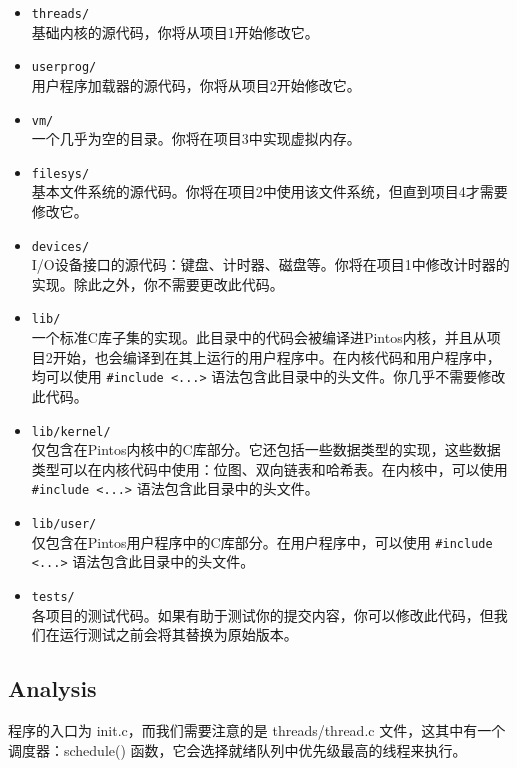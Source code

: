 \begin{itemize}
    \item \texttt{threads/}\\
    基础内核的源代码，你将从项目1开始修改它。
    
    \item \texttt{userprog/}\\
    用户程序加载器的源代码，你将从项目2开始修改它。
    
    \item \texttt{vm/}\\
    一个几乎为空的目录。你将在项目3中实现虚拟内存。
    
    \item \texttt{filesys/}\\
    基本文件系统的源代码。你将在项目2中使用该文件系统，但直到项目4才需要修改它。
    
    \item \texttt{devices/}\\
    I/O设备接口的源代码：键盘、计时器、磁盘等。你将在项目1中修改计时器的实现。除此之外，你不需要更改此代码。
    
    \item \texttt{lib/}\\
    一个标准C库子集的实现。此目录中的代码会被编译进Pintos内核，并且从项目2开始，也会编译到在其上运行的用户程序中。在内核代码和用户程序中，均可以使用 \texttt{\#include <...>} 语法包含此目录中的头文件。你几乎不需要修改此代码。
    
    \item \texttt{lib/kernel/}\\
    仅包含在Pintos内核中的C库部分。它还包括一些数据类型的实现，这些数据类型可以在内核代码中使用：位图、双向链表和哈希表。在内核中，可以使用 \texttt{\#include <...>} 语法包含此目录中的头文件。
    
    \item \texttt{lib/user/}\\
    仅包含在Pintos用户程序中的C库部分。在用户程序中，可以使用 \texttt{\#include <...>} 语法包含此目录中的头文件。
    
    \item \texttt{tests/}\\
    各项目的测试代码。如果有助于测试你的提交内容，你可以修改此代码，但我们在运行测试之前会将其替换为原始版本。
\end{itemize}

\subsection{Analysis}
程序的入口为 init.c，而我们需要注意的是 threads/thread.c 文件，这其中有一个调度器：schedule() 函数，它会选择就绪队列中优先级最高的线程来执行。

